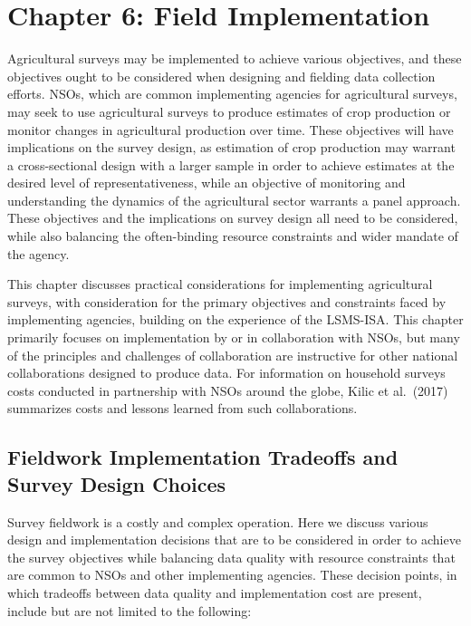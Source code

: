 \documentclass[
]{book}
\begin{document}
\hypertarget{chapter-6-field-implementation}{%
\chapter{Chapter 6: Field Implementation}\label{chapter-6-field-implementation}}

Agricultural surveys may be implemented to achieve various objectives, and these objectives ought to be considered when designing and fielding data collection efforts. NSOs, which are common implementing agencies for agricultural surveys, may seek to use agricultural surveys to produce estimates of crop production or monitor changes in agricultural production over time. These objectives will have implications on the survey design, as estimation of crop production may warrant a cross-sectional design with a larger sample in order to achieve estimates at the desired level of representativeness, while an objective of monitoring and understanding the dynamics of the agricultural sector warrants a panel approach. These objectives and the implications on survey design all need to be considered, while also balancing the often-binding resource constraints and wider mandate of the agency.

This chapter discusses practical considerations for implementing agricultural surveys, with consideration for the primary objectives and constraints faced by implementing agencies, building on the experience of the LSMS-ISA. This chapter primarily focuses on implementation by or in collaboration with NSOs, but many of the principles and challenges of collaboration are instructive for other national collaborations designed to produce data. For information on household surveys costs conducted in partnership with NSOs around the globe, Kilic et al.~(2017) summarizes costs and lessons learned from such collaborations.

\hypertarget{fieldwork-implementation-tradeoffs-and-survey-design-choices}{%
\section{Fieldwork Implementation Tradeoffs and Survey Design Choices}\label{fieldwork-implementation-tradeoffs-and-survey-design-choices}}

Survey fieldwork is a costly and complex operation. Here we discuss various design and implementation decisions that are to be considered in order to achieve the survey objectives while balancing data quality with resource constraints that are common to NSOs and other implementing agencies. These decision points, in which tradeoffs between data quality and implementation cost are present, include but are not limited to the following:
\end{document}

